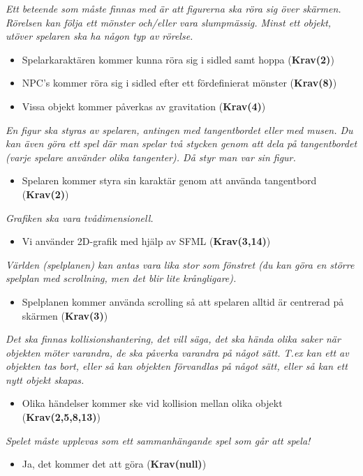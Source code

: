 \documentclass{TDP003mall}
\begin{document}
\noindent\textit{Ett beteende som måste finnas med är att figurerna ska röra sig över skärmen. Rörelsen kan följa ett
mönster och/eller vara slumpmässig. Minst ett objekt, utöver spelaren ska ha någon typ av rörelse.}
\begin{itemize}
\item Spelarkaraktären kommer kunna röra sig i sidled samt hoppa (\textbf{Krav(2)})
\item NPC's kommer röra sig i sidled efter ett fördefinierat mönster (\textbf{Krav(8)})
\item Vissa objekt kommer påverkas av gravitation (\textbf{Krav(4)})
\end{itemize}

\noindent\textit{En figur ska styras av spelaren, antingen med tangentbordet eller med musen. Du kan även göra ett spel där
man spelar två stycken genom att dela på tangentbordet (varje spelare använder olika tangenter). Då styr
man var sin figur.}
\begin{itemize}
\item Spelaren kommer styra sin karaktär genom att använda tangentbord (\textbf{Krav(2)})
\end{itemize}

\noindent\textit{Grafiken ska vara tvådimensionell.}
\begin{itemize}
\item Vi använder 2D-grafik med hjälp av SFML (\textbf{Krav(3,14)})
\end{itemize}

\noindent\textit{Världen (spelplanen) kan antas vara lika stor som fönstret (du kan göra en större spelplan med scrollning,
men det blir lite krångligare).}
\begin{itemize}
\item Spelplanen kommer använda scrolling så att spelaren alltid är centrerad på skärmen (\textbf{Krav(3)})
\end{itemize}

\textit{Det ska finnas kollisionshantering, det vill säga, det ska hända olika saker när objekten möter varandra, 
de ska påverka varandra på något sätt. T.ex kan ett av objekten tas bort, eller så kan objekten förvandlas på
något sätt, eller så kan ett nytt objekt skapas.}
\begin{itemize}
\item Olika händelser kommer ske vid kollision mellan olika objekt (\textbf{Krav(2,5,8,13)})
\end{itemize}

\noindent\textit{Spelet måste upplevas som ett sammanhängande spel som går att spela!}
\begin{itemize}
\item Ja, det kommer det att göra (\textbf{Krav(null)})
\end{itemize}
\end{document}
